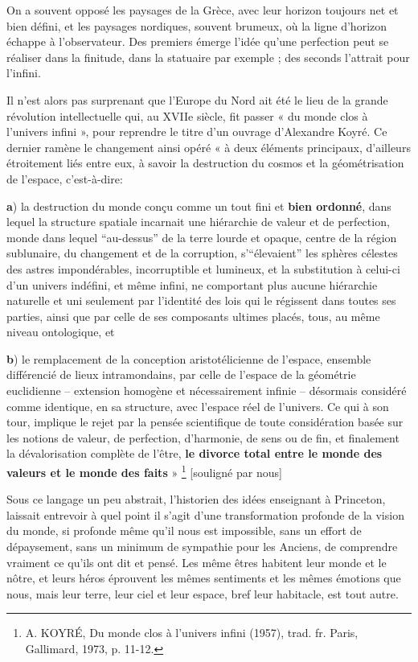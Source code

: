 \documentclass[a4paper,12pt]{article}
\begin{document}
On a souvent opposé les paysages de la Grèce, avec leur horizon toujours net et bien défini, et les paysages nordiques, souvent brumeux, où la ligne d'horizon échappe à l'observateur. Des premiers émerge l'idée qu'une perfection peut se réaliser dans la finitude, dans la statuaire par exemple ; des seconds l'attrait pour l'infini. 

Il n'est alors pas surprenant que l'Europe du Nord ait été le lieu de la grande révolution intellectuelle qui, au XVIIe siècle, fit passer « du monde clos à l'univers infini », pour reprendre le titre d'un ouvrage d'Alexandre Koyré. Ce dernier ramène le changement ainsi opéré « à deux éléments principaux, d'ailleurs étroitement liés entre eux, à savoir la destruction du cosmos et la géométrisation de l'espace, c'est-à-dire:

\textbf{a}) la destruction du monde conçu comme un tout fini et  \textbf{bien ordonné}, dans lequel la structure spatiale incarnait une hiérarchie de valeur et de perfection, monde dans lequel “au-dessus” de la terre lourde et opaque, centre de la région sublunaire, du changement et de la corruption, s'“élevaient” les sphères célestes des astres impondérables, incorruptible et lumineux, et la substitution à celui-ci d'un univers indéfini, et même infini, ne comportant plus aucune hiérarchie naturelle et uni seulement par l'identité des lois qui le régissent dans toutes ses parties, ainsi que par celle de ses composants ultimes placés, tous, au même niveau ontologique, et 

\textbf{b}) le remplacement de la conception aristotélicienne de l'espace, ensemble différencié de lieux intramondains, par celle de l'espace de la géométrie euclidienne – extension homogène et nécessairement infinie  – désormais considéré comme identique, en sa structure, avec l'espace réel de l'univers. Ce qui à son tour, implique le rejet par la pensée scientifique de toute considération basée sur les notions de valeur, de perfection, d'harmonie, de sens ou de fin, et finalement la dévalorisation complète de l’être, \textbf{le divorce total entre le monde des valeurs et le monde des faits} » \footnote{A. KOYRÉ, Du monde clos à l’univers infini (1957), trad. fr. Paris, Gallimard, 1973, p. 11-12.} [souligné par nous]

Sous ce langage un peu abstrait, l’historien des idées enseignant à Princeton, laissait entrevoir à quel point il s'agit d'une transformation profonde de la vision du monde, si profonde même qu'il nous est impossible, sans un effort de dépaysement, sans un minimum de sympathie pour les Anciens, de comprendre vraiment ce qu'ils ont dit et pensé. Les même êtres habitent leur monde et le nôtre, et leurs héros éprouvent les mêmes sentiments et les mêmes émotions que nous, mais leur terre, leur ciel et leur espace, bref leur habitacle, est tout autre.
\end{document}

